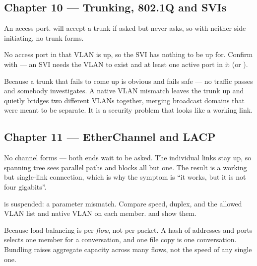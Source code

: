 \subsection*{Chapter 10 --- Trunking, 802.1Q and SVIs}
\begin{tightnum}
  \item An access port.  will accept a trunk if asked but never
        asks, so with neither side initiating, no trunk forms.
  \item No access port in that VLAN is up, so the SVI has nothing to be up for.
        Confirm with  --- an SVI needs the VLAN to exist and
        at least one active port in it (or ).
  \item Because a trunk that fails to come up is obvious and fails safe --- no
        traffic passes and somebody investigates. A native VLAN mismatch leaves
        the trunk up and quietly bridges two different VLANs together, merging
        broadcast domains that were meant to be separate. It is a security
        problem that looks like a working link.
\end{tightnum}

\subsection*{Chapter 11 --- EtherChannel and LACP}
\begin{tightnum}
  \item No channel forms --- both ends wait to be asked. The individual links stay
        up, so spanning tree sees parallel paths and blocks all but one. The
        result is a working but single-link connection, which is why the symptom
        is ``it works, but it is not four gigabits''.
  \item {} is suspended: a parameter mismatch. Compare speed, duplex, and
        the allowed VLAN list and native VLAN on each member.  and  show them.
  \item Because load balancing is per-\emph{flow}, not per-packet. A hash of
        addresses and ports selects one member for a conversation, and one file
        copy is one conversation. Bundling raises aggregate capacity across many
        flows, not the speed of any single one.
\end{tightnum}

